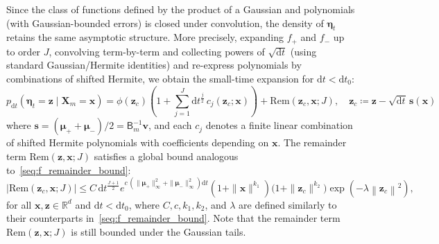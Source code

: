 \documentclass[
 longbibliography,
 twocolumn,
 superscriptaddress,
 amsmath,
 amssymb,
 amsthm,
 amsfonts,
 prl,
 floatfix,
]{revtex4-2}
\newcommand{\matbf}[1]{\boldsymbol{\mathsf{#1}}}
\begin{document}
\begin{widetext}
Since the class of functions defined by the product of a Gaussian and polynomials (with Gaussian-bounded errors) is closed under convolution, the density of $\bm\eta_t$ retains the same asymptotic structure. More precisely, expanding $f_+$ and $f_-$ up to order $J$, convolving term-by-term and collecting powers of $\sqrt{\mathrm dt}$ (using standard Gaussian/Hermite identities) and re-express polynomials by combinations of shifted Hermite, we obtain the small-time expansion for $\mathrm dt<\mathrm dt_0$:
\begin{equation}
    p_{\mathrm dt}(\bm\eta_t=\bm z \mid \bm X_m=\bm x)
    =\phi\!\left(\bm z_c\right)
    \left(1+\sum_{j=1}^{J}\mathrm dt^{\frac{j}{2}}\,
    c_j\!\left(\bm z_c;\bm x\right)\right)
    +\mathrm{Rem}\!\left(\bm z_c,\bm x;J\right),
    \quad
    \bm z_c\coloneqq\bm z-\sqrt{\mathrm dt}\,\bm s(\bm x)
    \label{seq:p_dt_sqrt_dt_expansion}
\end{equation}
where $\bm s=(\bm\mu_++\bm\mu_-)/2=\matbf{B}_m^{-1}\bm v$, and each $c_j$ denotes a finite linear combination of shifted Hermite polynomials with coefficients depending on $\bm x$. The remainder term $\mathrm{Rem}(\bm z,\bm x;J)$ satisfies a global bound analogous to~\eqref{seq:f_remainder_bound}:
\begin{equation}
    \left\vert\mathrm{Rem}\!\left(\bm z_c,\bm x;J\right)\right\vert
    \leq
    C\,\mathrm dt^{\frac{J+1}{2}}
    e^{c\,\left(\|\bm\mu_+\|_\infty^2+\|\bm\mu_-\|_\infty^2\right)\mathrm dt}
    \!\left(1+\|\bm x\|^{k_1}\right)
    \big(1+\|\bm z_c\|^{k_2}\big)
    \exp\!\left(-\lambda\left\|\bm z_c\right\|^2\right),
    \label{seq:p_remainder_bound}
\end{equation}
for all $\bm x,\bm z\in\mathbb R^d$ and $\mathrm dt<\mathrm dt_0$,
where $C,c,k_1, k_2$, and $\lambda$ are defined similarly to their counterparts in~\eqref{seq:f_remainder_bound}. Note that the remainder term $\mathrm{Rem}(\bm z,\bm x;J)$ is still bounded under the Gaussian tails.


\end{widetext}
\end{document}
